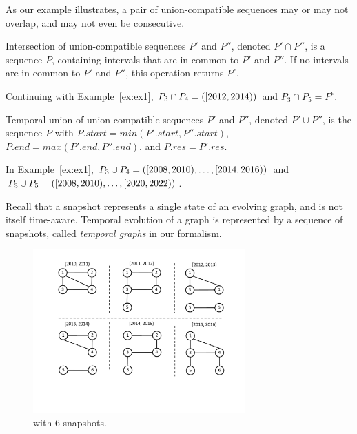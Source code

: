 As our example illustrates, a pair of union-compatible sequences may
or may not overlap, and may not even be consecutive.

\begin{definition}  
Intersection of union-compatible sequences $P'$ and $P''$, denoted $P'
\cap P''$, is a sequence $P$, containing intervals that are in common
to $P'$ and $P''$.  If no intervals are in common to $P'$ and $P''$,
this operation returns $P^{\epsilon}$.
\label{def:tseqand}
\end{definition}

Continuing with Example~\ref{ex:ex1}, $P_3 \cap P_4 =
([2012,2014))$ and $P_3 \cap P_5 = P^{\epsilon}$.

\begin{definition} 
Temporal union of union-compatible sequences $P'$ and $P''$, denoted
$P' \cup P''$, is the sequence $P$ with $P.start = min(P'.start,
P''.start)$, $P.end = max(P'.end, P''.end)$, and $P.res = P'.res$.
\label{def:tseqor}
\end{definition}

In Example~\ref{ex:ex1}, $P_3 \cup P_4 =
([2008,2010),\ldots,[2014,2016))$ and $P_3
    \cup P_5 = ([2008,2010), \ldots,
      [2020,2022))$.

Recall that a snapshot represents a single state of an evolving graph,
and is not itself time-aware.  Temporal evolution of a graph is
represented by a sequence of snapshots, called {\em temporal graphs}
in our formalism.

\begin{figure}
\includegraphics[width=3.2in]{figs/6snaps.pdf}
\caption{\tg {} with 6 snapshots.} 
\label{fig:tg}
\end{figure}

